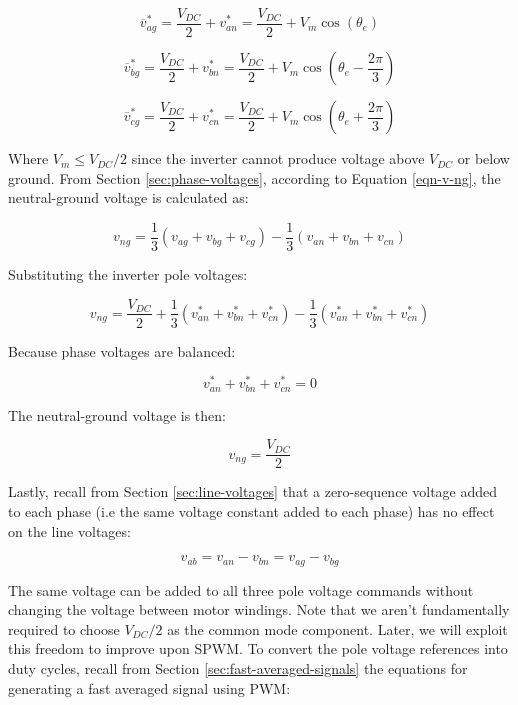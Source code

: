 \documentclass{article}
\begin{document}
\begin{equation}
    \overline{v}_{ag}^* = \frac{V_{DC}}{2} + v_{an}^* = \frac{V_{DC}}{2} + V_m\cos(\theta_e)
\end{equation}

\begin{equation}
    \overline{v}_{bg}^* = \frac{V_{DC}}{2} + v_{bn}^* =\frac{V_{DC}}{2} + V_m\cos(\theta_e - \frac{2\pi}{3})
\end{equation}

\begin{equation}
    \overline{v}_{cg}^* = \frac{V_{DC}}{2} + v_{cn}^* = \frac{V_{DC}}{2} + V_m\cos(\theta_e + \frac{2\pi}{3})
\end{equation}

Where $V_m \leq V_{DC}/2$ since the inverter cannot produce voltage above $V_{DC}$ or below ground. From Section \ref{sec:phase-voltages}, according to Equation \ref{eqn-v-ng}, the neutral-ground voltage is calculated as:

\begin{equation}
    v_{ng} = \frac{1}{3}(v_{ag} + v_{bg} + v_{cg}) - \frac{1}{3}(v_{an} + v_{bn} + v_{cn})
\end{equation}

Substituting the inverter pole voltages:

\begin{equation}
    v_{ng} = \frac{V_{DC}}{2} + \frac{1}{3}(v_{an}^* + v_{bn}^* + v_{cn}^*) - \frac{1}{3}(v_{an}^* + v_{bn}^* + v_{cn}^*)
\end{equation}

Because phase voltages are balanced:

\begin{equation}
    v_{an}^* + v_{bn}^* + v_{cn}^* = 0
\end{equation}

The neutral-ground voltage is then:

\begin{equation}
    v_{ng} = \frac{V_{DC}}{2}
\end{equation}

Lastly, recall from Section \ref{sec:line-voltages} that a zero-sequence voltage added to each phase (i.e the same voltage constant added to each phase) has no effect on the line voltages:

\begin{equation}
    v_{ab} = v_{an} - v_{bn} = v_{ag} - v_{bg}
\end{equation}

The same voltage can be added to all three pole voltage commands without changing the voltage between motor windings. Note that we aren't fundamentally required to choose $V_{DC}/2$ as the common mode component. Later, we will exploit this freedom to improve upon SPWM. To convert the pole voltage references into duty cycles, recall from Section \ref{sec:fast-averaged-signals} the equations for generating a fast averaged signal using PWM: 
\end{document}
